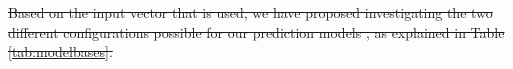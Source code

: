 \documentclass[review]{elsarticle}
\makeatletter
\newcommand*{\@rowstyle}{}
\newcommand*{\rowstyle}[1]{%
  \gdef\@rowstyle{#1}%
  \@rowstyle\ignorespaces%
}
\providecommand{\DIFdeltex}[1]{{\protect\color{red}\sout{#1}}}                      %
\providecommand{\DIFdelbegin}{} %
\providecommand{\DIFdelend}{} %
\providecommand{\DIFdel}[1]{\texorpdfstring{\DIFdeltex{#1}}{}} %
\newcommand{\DIFscaledelfig}{0.5}
\newlength{\DIFdelgraphicswidth} %
\newlength{\DIFdelgraphicsheight} %
\newcommand{\DIFdelincludegraphics}[2][]{%
\sbox{\DIFdelgraphicsbox}{\DIFOincludegraphics[#1]{#2}}%
\settoboxwidth{\DIFdelgraphicswidth}{\DIFdelgraphicsbox} %
\settoboxtotalheight{\DIFdelgraphicsheight}{\DIFdelgraphicsbox} %
\scalebox{\DIFscaledelfig}{%
\parbox[b]{\DIFdelgraphicswidth}{\usebox{\DIFdelgraphicsbox}\\[-\baselineskip] \rule{\DIFdelgraphicswidth}{0em}}\llap{\resizebox{\DIFdelgraphicswidth}{\DIFdelgraphicsheight}{%
\setlength{\unitlength}{\DIFdelgraphicswidth}%
\begin{picture}(1,1)%
\thicklines\linethickness{2pt} %
{\color[rgb]{1,0,0}\put(0,0){\framebox(1,1){}}}%
{\color[rgb]{1,0,0}\put(0,0){\line( 1,1){1}}}%
{\color[rgb]{1,0,0}\put(0,1){\line(1,-1){1}}}%
\end{picture}%
}\hspace*{3pt}}} %
} %
\DeclareRobustCommand{\DIFdelbegin}{\DIFOdelbegin \let\includegraphics\DIFdelincludegraphics} %
\DeclareRobustCommand{\DIFdelend}{\DIFOaddend \let\includegraphics\DIFOincludegraphics} %
\makeatother
\begin{document}

\DIFdelbegin \DIFdel{Based on the input vector that is used, we have proposed investigating the two different configurations possible for our prediction models , as explained in Table \ref{tab:modelbases}.
}\DIFdelend %
\end{document}
